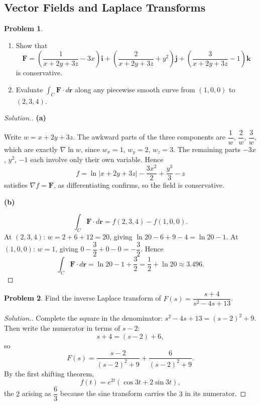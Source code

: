 \documentclass[11pt,a4paper]{article}
\theoremstyle{definition}
\newtheorem{problemx}{Problem}[subsection]
\newenvironment{problem}{\begin{problemx}}{\end{problemx}}
\newenvironment{solution}
  {\renewcommand{\qedsymbol}{}\begin{proof}[\textit{Solution}.]}
  {\end{proof}}
\newcommand{\subhead}[1]{%
  \par\medskip\noindent\textbf{#1}\par\nobreak\smallskip}
\begin{document}
\subsection{Vector Fields and Laplace Transforms}

\begin{problem}
\begin{enumerate}
\item[(a)] Show that
\[\mathbf{F} = \left(\frac{1}{x+2y+3z}-3x\right)\mathbf{i}
+ \left(\frac{2}{x+2y+3z}+y^2\right)\mathbf{j}
+ \left(\frac{3}{x+2y+3z}-1\right)\mathbf{k}\]
is conservative.
\item[(b)] Evaluate $\int_C\mathbf{F}\cdot d\mathbf r$ along any piecewise
smooth curve from $(1,0,0)$ to $(2,3,4)$.
\end{enumerate}
\end{problem}
\begin{solution}
\subhead{(a)}
Write $w = x+2y+3z$. The awkward parts of the three components are
$\dfrac1w$, $\dfrac2w$, $\dfrac3w$, which are exactly
$\nabla\ln w$, since $w_x = 1$, $w_y = 2$, $w_z = 3$. The remaining parts
$-3x$, $y^2$, $-1$ each involve only their own variable. Hence
\[f = \ln\left|x+2y+3z\right| - \frac{3x^2}{2} + \frac{y^3}{3} - z\]
satisfies $\nabla f = \mathbf{F}$, as differentiating confirms, so the field is
conservative.

\subhead{(b)}
\[\int_C\mathbf{F}\cdot d\mathbf r = f(2,3,4)-f(1,0,0).\]
At $(2,3,4)$: $w = 2+6+12 = 20$, giving
$\ln 20 - 6 + 9 - 4 = \ln 20 - 1$.
At $(1,0,0)$: $w=1$, giving $0 - \dfrac32 + 0 - 0 = -\dfrac32$. Hence
\[\int_C\mathbf{F}\cdot d\mathbf r = \ln 20 - 1 + \frac32
= \frac12 + \ln 20 \approx 3.496 .\]
\end{solution}

\begin{problem}
Find the inverse Laplace transform of
$F(s) = \dfrac{s+4}{s^2-4s+13}$.
\end{problem}
\begin{solution}
Complete the square in the denominator:
$s^2-4s+13 = (s-2)^2+9$. Then write the numerator in terms of $s-2$:
\[s+4 = (s-2)+6 ,\]
so
\[F(s) = \frac{s-2}{(s-2)^2+9} + \frac{6}{(s-2)^2+9}.\]
By the first shifting theorem,
\[f(t) = e^{2t}(\cos 3t + 2\sin 3t),\]
the $2$ arising as $\dfrac63$ because the sine transform carries the $3$ in its
numerator.
\end{solution}
\end{document}
